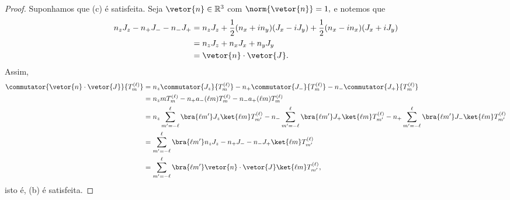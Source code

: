 \begin{proof}
   Suponhamos que (c) é satisfeita. Seja \(\vetor{n} \in \mathbb{R}^3\) com \(\norm{\vetor{n}} = 1,\) e notemos que
   \begin{align*}
      n_z J_z - n_+ J_- - n_- J_+ &= n_z J_z + \frac12(n_x + i n_y) (J_x - i J_y) + \frac12(n_x - i n_x) (J_x + i J_y)\\
                                  &= n_z J_z + n_x J_x + n_y J_y\\
                                  &= \vetor{n}\cdot \vetor{J}.
   \end{align*}
   Assim, 
   \begin{align*}
      \commutator{\vetor{n}\cdot\vetor{J}}{T^{(\ell)}_m} 
      &= n_z\commutator{J_z}{T^{(\ell)}_m} - n_+\commutator{J_-}{T^{(\ell)}_m} - n_-\commutator{J_+}{T^{(\ell)}_m}\\
      &= n_z m T^{(\ell)}_m - n_+ a_-(\ell m) T^{(\ell)}_m - n_- a_+(\ell m) T^{(\ell)}_m\\
      &= n_z \sum_{m' = -\ell}^\ell{\bra{\ell m'}J_z\ket{\ell m} T^{(\ell)}_{m'}} - n_- \sum_{m' = - \ell}^\ell{\bra{\ell m'}J_+\ket{\ell m}T^{(\ell)}_{m'}}- n_+ \sum_{m' = - \ell}^\ell{\bra{\ell m'}J_-\ket{\ell m}T^{(\ell)}_{m'}}\\
      &= \sum_{m' = - \ell}^{\ell}{\bra{\ell m'} n_z J_z - n_+ J_- - n_- J_+\ket{\ell m} T^{(\ell)}_{m'}}\\
      &= \sum_{m' = - \ell}^{\ell}{\bra{\ell m'} \vetor{n}\cdot\vetor{J} \ket{\ell m} T^{(\ell)}_{m'}},
   \end{align*}
   isto é, (b) é satisfeita.
\end{proof}
